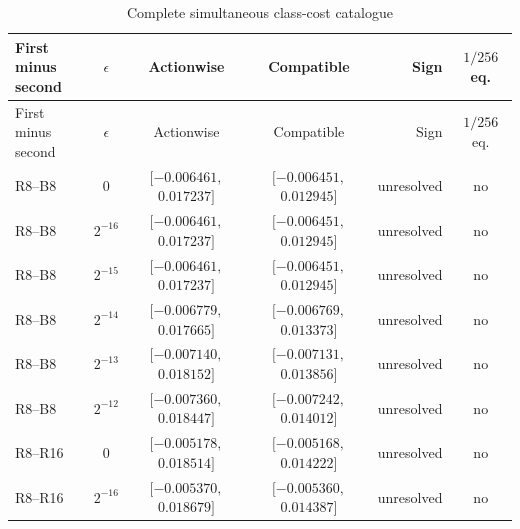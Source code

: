 {\small\setlength{\tabcolsep}{3pt}\renewcommand{\arraystretch}{1.12}
\begin{longtable}{lcccrc}
\caption{Complete simultaneous class-cost catalogue}\label{tab:all-comparisons84}\\
\hline
\shortstack[l]{First minus\\second} & $\epsilon$ & Actionwise & Compatible & Sign & $1/256$ eq. \\
\hline
\endfirsthead
\hline
\shortstack[l]{First minus\\second} & $\epsilon$ & Actionwise & Compatible & Sign & $1/256$ eq. \\
\hline
\endhead
R8--B8 & $0$ & \shortstack[r]{$[-0.006461,$\\$0.017237]$} & \shortstack[r]{$[-0.006451,$\\$0.012945]$} & unresolved & no \\
R8--B8 & $2^{-16}$ & \shortstack[r]{$[-0.006461,$\\$0.017237]$} & \shortstack[r]{$[-0.006451,$\\$0.012945]$} & unresolved & no \\
R8--B8 & $2^{-15}$ & \shortstack[r]{$[-0.006461,$\\$0.017237]$} & \shortstack[r]{$[-0.006451,$\\$0.012945]$} & unresolved & no \\
R8--B8 & $2^{-14}$ & \shortstack[r]{$[-0.006779,$\\$0.017665]$} & \shortstack[r]{$[-0.006769,$\\$0.013373]$} & unresolved & no \\
R8--B8 & $2^{-13}$ & \shortstack[r]{$[-0.007140,$\\$0.018152]$} & \shortstack[r]{$[-0.007131,$\\$0.013856]$} & unresolved & no \\
R8--B8 & $2^{-12}$ & \shortstack[r]{$[-0.007360,$\\$0.018447]$} & \shortstack[r]{$[-0.007242,$\\$0.014012]$} & unresolved & no \\
R8--R16 & $0$ & \shortstack[r]{$[-0.005178,$\\$0.018514]$} & \shortstack[r]{$[-0.005168,$\\$0.014222]$} & unresolved & no \\
R8--R16 & $2^{-16}$ & \shortstack[r]{$[-0.005370,$\\$0.018679]$} & \shortstack[r]{$[-0.005360,$\\$0.014387]$} & unresolved & no \\

\end{longtable}}
